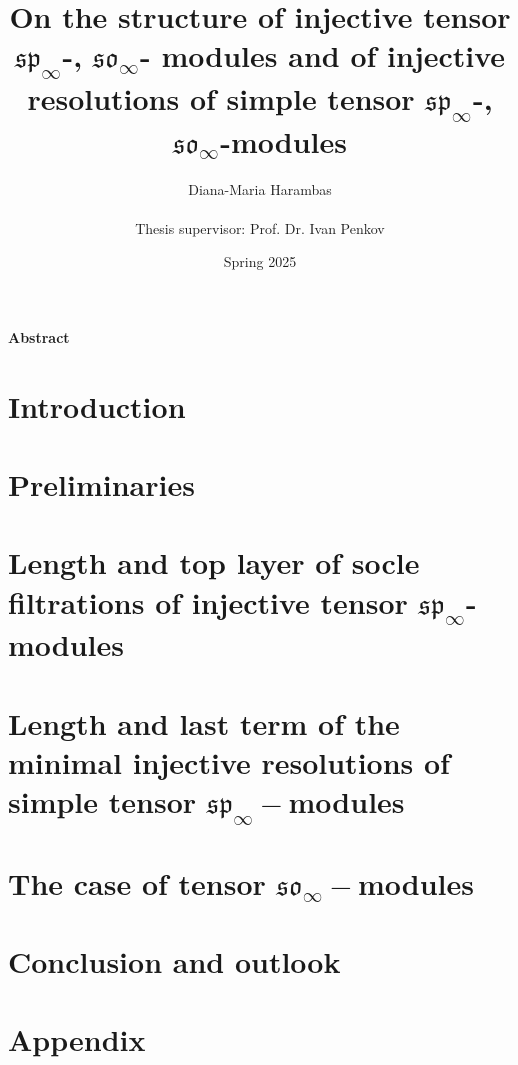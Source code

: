 
\usepackage{subfiles}
\usepackage{graphicx,subfig}
\usepackage{pdfpages}
\newcommand{\bb}[1]{\mathbb{#1}}
\newcommand{\soc}[1]{\overline{\text{soc}}^{#1}}
\newcommand{\res}[1]{\text{res}^{#1}}
\newcommand{\tof}[1]{\xrightarrow[]{#1}}
\newcommand{\im}[1]{\text{im }{#1}}
\newcommand{\LR}[3]{\text{N}^{#1}_{#2, #3}}

\title{\textbf{On the structure of injective tensor $\mathfrak{sp}_\infty$-, $\mathfrak{so}_\infty$- modules}\textbf{ and of injective resolutions of simple tensor } $\mathfrak{sp}_\infty$\textbf{-}, $ \mathfrak{so}_\infty$\textbf{-modules}}
\author{Diana-Maria Harambas \\ \\ Thesis supervisor: Prof. Dr. Ivan Penkov \\}
\date{Spring 2025}


\maketitle
\begin{center}
    \vspace{3cm}
    \textbf{Abstract}
\end{center}



\newpage
\setcounter{tocdepth}{2}
\tableofcontents
\newpage


\section{Introduction}


\section{Preliminaries}


\section{Length and top layer of socle filtrations of injective tensor $\mathfrak{sp}_\infty$-modules}


\section{Length and last term of the minimal injective resolutions of simple tensor $\mathfrak{sp}_\infty-$modules}


\section{The case of tensor $\mathfrak{so}_\infty-$modules}


\section{Conclusion and outlook}

\newpage
\section{Appendix}

\newpage
\nocite{*}




